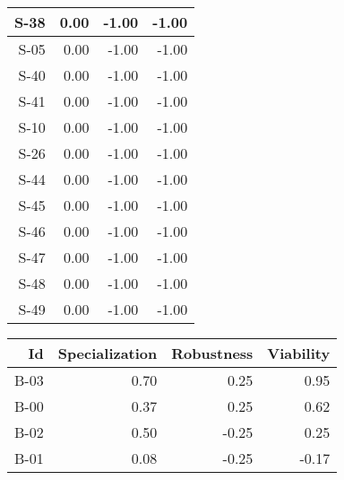 \begin{tabular}{ | r | r | r | r | }
    \hline
                  S-38  &            0.00  &           -1.00  &           -1.00  \\
    \hline
                  S-05  &            0.00  &           -1.00  &           -1.00  \\
    \hline
                  S-40  &            0.00  &           -1.00  &           -1.00  \\
    \hline
                  S-41  &            0.00  &           -1.00  &           -1.00  \\
    \hline
                  S-10  &            0.00  &           -1.00  &           -1.00  \\
    \hline
                  S-26  &            0.00  &           -1.00  &           -1.00  \\
    \hline
                  S-44  &            0.00  &           -1.00  &           -1.00  \\
    \hline
                  S-45  &            0.00  &           -1.00  &           -1.00  \\
    \hline
                  S-46  &            0.00  &           -1.00  &           -1.00  \\
    \hline
                  S-47  &            0.00  &           -1.00  &           -1.00  \\
    \hline
                  S-48  &            0.00  &           -1.00  &           -1.00  \\
    \hline
                  S-49  &            0.00  &           -1.00  &           -1.00  \\
    \hline
\end{tabular}


\begin{tabular}{ | r | r | r | r | }
    \hline
                    Id  &  Specialization  &      Robustness  &       Viability  \\
    \hline
    \hline
                  B-03  &            0.70  &            0.25  &            0.95  \\
    \hline
                  B-00  &            0.37  &            0.25  &            0.62  \\
    \hline
                  B-02  &            0.50  &           -0.25  &            0.25  \\
    \hline
                  B-01  &            0.08  &           -0.25  &           -0.17  \\
    \hline
\end{tabular}


